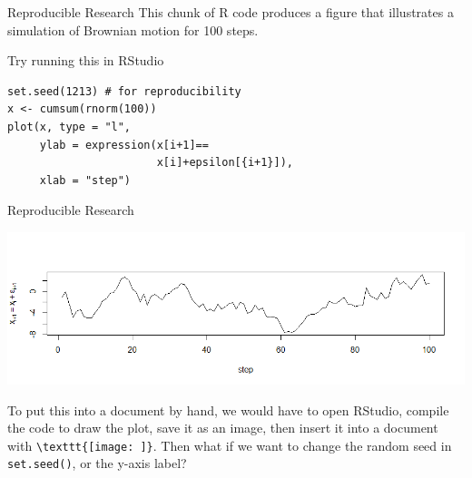 \documentclass{beamer}
\begin{document}
\begin{frame}[fragile]{Reproducible Research}
This chunk of R code produces a figure that illustrates a simulation of Brownian motion for 100 steps.
        \begin{exampleblock}{Try running this in RStudio}
\begin{lstlisting}
set.seed(1213) # for reproducibility
x <- cumsum(rnorm(100))
plot(x, type = "l",
     ylab = expression(x[i+1]==
                       x[i]+epsilon[{i+1}]),
     xlab = "step")
\end{lstlisting}
        \end{exampleblock}
\end{frame}

\begin{frame}[fragile]{Reproducible Research}
\begin{center}
    \includegraphics[width=.95\textwidth]{Brownian-motion.png}
\end{center}
To put this into a document by hand, we would have to open RStudio, compile the code to draw the plot, save it as an image, then insert it into a document with \verb|\texttt{[image: ]}|.
\vfill
Then what if we want to change the random seed in \verb|set.seed()|, or the y-axis label?
\vfill
\end{frame}
\end{document}
